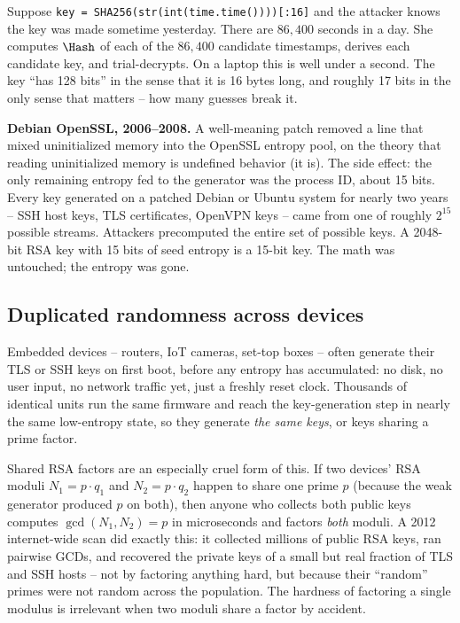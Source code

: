 \begin{example}
\label{ch38:ex-time-seed}
Suppose \texttt{key = SHA256(str(int(time.time())))[:16]} and the attacker knows the key was made sometime yesterday. There are $86{,}400$ seconds in a day. She computes $\Hash$ of each of the $86{,}400$ candidate timestamps, derives each candidate key, and trial-decrypts. On a laptop this is well under a second. The key ``has 128 bits'' in the sense that it is 16 bytes long, and roughly 17 bits in the only sense that matters -- how many guesses break it.
\end{example}

\begin{attackbox}
\textbf{Debian OpenSSL, 2006--2008.} A well-meaning patch removed a line that mixed uninitialized memory into the OpenSSL entropy pool, on the theory that reading uninitialized memory is undefined behavior (it is). The side effect: the only remaining entropy fed to the generator was the process ID, about 15 bits. Every key generated on a patched Debian or Ubuntu system for nearly two years -- SSH host keys, TLS certificates, OpenVPN keys -- came from one of roughly $2^{15}$ possible streams. Attackers precomputed the entire set of possible keys. A 2048-bit RSA key with 15 bits of seed entropy is a 15-bit key. The math was untouched; the entropy was gone.
\end{attackbox}

\subsection{Duplicated randomness across devices}
\label{ch38:duplicated-random}

Embedded devices -- routers, IoT cameras, set-top boxes -- often generate their TLS or SSH keys on first boot, before any entropy has accumulated: no disk, no user input, no network traffic yet, just a freshly reset clock. Thousands of identical units run the same firmware and reach the key-generation step in nearly the same low-entropy state, so they generate \emph{the same keys}, or keys sharing a prime factor.

\begin{whybox}
Shared RSA factors are an especially cruel form of this. If two devices' RSA moduli $N_1 = p\cdot q_1$ and $N_2 = p \cdot q_2$ happen to share one prime $p$ (because the weak generator produced $p$ on both), then anyone who collects both public keys computes $\gcd(N_1, N_2) = p$ in microseconds and factors \emph{both} moduli. A 2012 internet-wide scan did exactly this: it collected millions of public RSA keys, ran pairwise GCDs, and recovered the private keys of a small but real fraction of TLS and SSH hosts -- not by factoring anything hard, but because their ``random'' primes were not random across the population. The hardness of factoring a single modulus is irrelevant when two moduli share a factor by accident.
\end{whybox}

